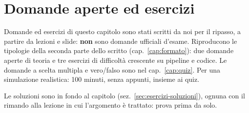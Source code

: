 \chapter{Domande aperte ed esercizi}
\label{cap:esercizi}

\begin{nota}
Domande ed esercizi di questo capitolo sono stati scritti da noi per il ripasso, a partire da lezioni
e slide: \textbf{non} sono domande ufficiali d'esame. Riproducono le tipologie della seconda parte
dello scritto (cap.~\ref{cap:formato}): due domande aperte di teoria e tre esercizi di difficoltà
crescente su pipeline e codice. Le domande a scelta multipla e vero/falso sono nel cap.~\ref{cap:quiz}.
Per una simulazione realistica: 100 minuti, senza appunti, insieme ai quiz.
\end{nota}

Le soluzioni sono in fondo al capitolo (sez.~\ref{sec:esercizi-soluzioni}), ognuna con il rimando
alla lezione in cui l'argomento è trattato: prova prima da solo.

